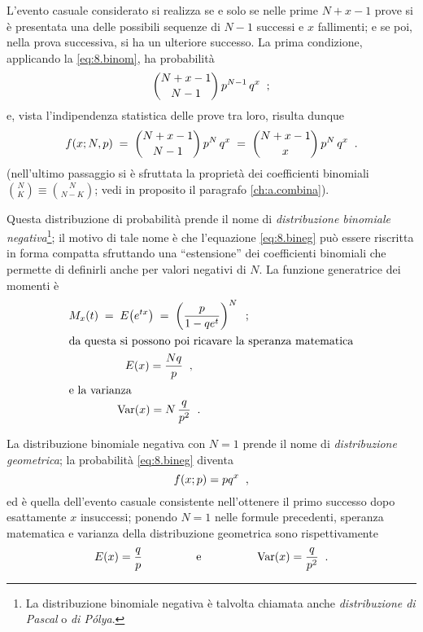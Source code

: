 L'evento casuale considerato si realizza se e solo se nelle
prime $N + x - 1$ prove si \`e presentata una delle
possibili sequenze di $N - 1$ successi e $x$ fallimenti; e
se poi, nella prova successiva, si ha un ulteriore successo.
La prima condizione, applicando la \eqref{eq:8.binom}, ha
probabilit\`a
\begin{equation*}
  \binom{N + x - 1}{N - 1} \, p^{N - 1} \, q^x \;\; ;
\end{equation*}
e, vista l'indipendenza statistica delle prove tra loro,
risulta dunque
\begin{equation} \label{eq:8.bineg}
  f(x; N, p) \; = \; \binom{N + x - 1}{N - 1} \, p^N \, q^x
  \; = \; \binom{N + x - 1}{x} \, p^N \, q^x \;\; .
\end{equation}
(nell'ultimo passaggio si \`e sfruttata la propriet\`a dei
coefficienti binomiali $\binom{N}{K} \equiv \binom{N}{N -
  K}$; vedi in proposito il paragrafo \ref{ch:a.combina}).

Questa distribuzione di probabilit\`a prende il nome di
\emph{distribuzione binomiale
  negativa}\thinspace\footnote{La distribuzione binomiale
  negativa \`e talvolta chiamata anche \emph{distribuzione
    di Pascal} o \emph{di P\'olya}.}; il motivo di tale nome
\`e che l'equazione \eqref{eq:8.bineg} pu\`o essere
riscritta in forma compatta sfruttando una ``estensione''
dei coefficienti binomiali che permette di definirli anche
per valori negativi di $N$.  La funzione generatrice dei
momenti \`e
\begin{gather*}
  M_x(t) \; = \; E \bigl( e^{tx} \bigr) \; = \; \left(
    \frac{p}{1 - q e^t} \right)^N \;\; ; \\
  \intertext{da questa si possono poi ricavare la speranza
    matematica}
  E(x) = \frac{N q}{p} \;\; , \\
  \intertext{e la varianza}
  \operatorname{Var}(x) = N \, \frac{q}{p^2} \;\; .
\end{gather*}

La distribuzione binomiale negativa con $N = 1$ prende il
nome di \emph{distribuzione geometrica};%
la probabilit\`a \eqref{eq:8.bineg} diventa
\begin{equation*}
  f(x; p) = p q^x \;\; ,
\end{equation*}
ed \`e quella dell'evento casuale consistente nell'ottenere
il primo successo dopo esattamente $x$ insuccessi; ponendo
$N = 1$ nelle formule precedenti, speranza matematica e
varianza della distribuzione geometrica sono rispettivamente
\begin{equation*}
  E(x) = \frac{q}{p} \makebox[35mm]{e} \var(x) =
  \frac{q}{p^2} \peq .
\end{equation*}%
%


